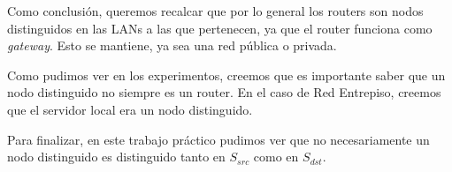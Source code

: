 Como conclusión, queremos recalcar que por lo general los routers son nodos distinguidos en las LANs a las que pertenecen, ya que el router funciona como \emph{gateway}. Esto se mantiene, ya sea una red pública o privada.

Como pudimos ver en los experimentos, creemos que es importante saber que un nodo distinguido no siempre es un router. En el caso de Red Entrepiso, creemos que el servidor local era un nodo distinguido.

Para finalizar, en este trabajo práctico pudimos ver que no necesariamente un nodo distinguido es distinguido tanto en $S_{src}$ como en $S_{dst}$.